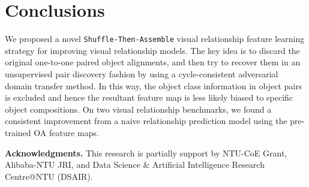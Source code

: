\documentclass[runningheads]{llncs}
\begin{document}
\section{Conclusions}
We proposed a novel \texttt{Shuffle-Then-Assemble} visual relationship feature learning strategy for improving visual relationship models. The key idea is to discard the original one-to-one paired object alignments, and then try to recover them in an unsupervised pair discovery fashion by using a cycle-consistent adversarial domain transfer method. In this way, the object class information in object pairs is excluded and hence the resultant feature map is less likely biased to specific object compositions. On two visual relationship benchmarks, we found a consistent improvement from a naive relationship prediction model using the pre-trained OA feature maps. 

\noindent\textbf{Acknowledgments.}
This research is partially support by NTU-CoE Grant, Alibaba-NTU JRI, and Data Science \& Artificial Intelligence Research Centre@NTU (DSAIR).
\clearpage



\end{document}
